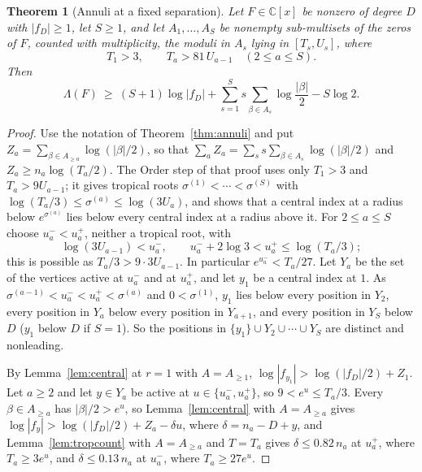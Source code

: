 \documentclass[11pt]{article}
\newtheorem{theorem}{Theorem}[section]
\begin{document}
\begin{theorem}[Annuli at a fixed separation]\label{thm:fixedgap}
Let $F\in\mathbb C[x]$ be nonzero of degree $D$ with $|f_D|\ge1$, let
$S\ge1$, and let $A_1,\ldots,A_S$ be nonempty sub-multisets of the zeros of
$F$, counted with multiplicity, the moduli in $A_s$ lying in $[T_s,U_s]$,
where
\[
  T_1>3,\qquad T_a>81\,U_{a-1}\quad(2\le a\le S).
\]
Then
\[
  \Lambda(F)\ \ge\ (S+1)\log|f_D|+\sum_{s=1}^Ss\sum_{\beta\in A_s}\log\frac{|\beta|}2-S\log2 .
\]
\end{theorem}

\begin{proof}
Use the notation of Theorem~\ref{thm:annuli} and put
$Z_a=\sum_{\beta\in A_{\ge a}}\log(|\beta|/2)$, so that
$\sum_aZ_a=\sum_ss\sum_{\beta\in A_s}\log(|\beta|/2)$ and
$Z_a\ge n_a\log(T_a/2)$.  The Order step of that proof uses only
$T_1>3$ and $T_{a}>9U_{a-1}$; it gives tropical roots
$\sigma^{(1)}<\cdots<\sigma^{(S)}$ with
$\log(T_a/3)\le\sigma^{(a)}\le\log(3U_a)$, and shows that a central index at
a radius below $e^{\sigma^{(a)}}$ lies below every central index at a radius
above it.  For $2\le a\le S$ choose
$u_a^-<u_a^+$, neither a tropical root, with
\[
  \log(3U_{a-1})<u_a^-,\qquad u_a^-+2\log3<u_a^+\le\log(T_a/3);
\]
this is possible as $T_a/3>9\cdot3U_{a-1}$.  In particular
$e^{u_a^-}<T_a/27$.  Let $Y_a$ be the set of the
vertices active at $u_a^-$ and at $u_a^+$, and let $y_1$ be a central index
at $1$.  As $\sigma^{(a-1)}<u_a^-<u_a^+<\sigma^{(a)}$ and $0<\sigma^{(1)}$,
$y_1$ lies below every position in $Y_2$, every
position in $Y_a$ below every position in $Y_{a+1}$, and every position in
$Y_S$ below $D$ ($y_1$ below $D$ if $S=1$).  So the positions in $\{y_1\}\cup Y_2\cup\cdots\cup Y_S$
are distinct and nonleading.

By Lemma~\ref{lem:central} at $r=1$ with $A=A_{\ge1}$,
$\log|f_{y_1}|>\log(|f_D|/2)+Z_1$.  Let $a\ge2$ and let $y\in Y_a$ be active
at $u\in\{u_a^-,u_a^+\}$, so $9<e^u\le T_a/3$.  Every $\beta\in A_{\ge a}$ has
$|\beta|/2>e^u$, so Lemma~\ref{lem:central} with $A=A_{\ge a}$ gives
$\log|f_y|>\log(|f_D|/2)+Z_a-\delta u$, where $\delta=n_a-D+y$, and
Lemma~\ref{lem:tropcount} with $A=A_{\ge a}$ and $T=T_a$ gives
$\delta\le0.82\,n_a$ at $u_a^+$, where $T_a\ge3e^u$, and $\delta\le0.13\,n_a$
at $u_a^-$, where $T_a\ge27e^u$.


\end{proof}
\end{document}
